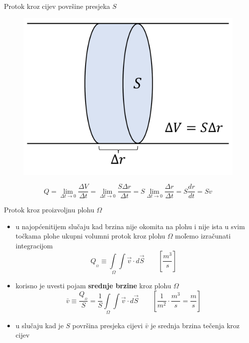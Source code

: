 \documentclass[croatian]{beamer}
\begin{document}
\begin{frame}{Protok kroz cijev površine presjeka $S$}

\begin{figure}
\includegraphics[scale=0.25]{figs/protok-kroz-cijev}
\end{figure}
\[
Q=\lim_{\Delta t\rightarrow0}\frac{\Delta V}{\Delta t}=\lim_{\Delta t\rightarrow0}\frac{S\Delta r}{\Delta t}=S\lim_{\Delta t\rightarrow0}\frac{\Delta r}{\Delta t}=S\frac{dr}{dt}=Sv
\]
\end{frame}

\begin{frame}{Protok kroz proizvoljnu plohu $\varOmega$}

\begin{itemize}
\item u najopćenitijem slučaju kad brzina nije okomita na plohu i nije ista
u svim točkama plohe ukupni volumni protok kroz plohu $\varOmega$
moľemo izračunati integracijom
\[
Q_{_{\varOmega}}\equiv\int\limits _{\;\varOmega}\!\!\!\!\!\int\vec{v}\cdot d\vec{S}\quad\quad[\frac{m^{3}}{s}]
\]
\item korisno je uvesti pojam \textbf{srednje brzine} kroz plohu $\varOmega$
\[
\bar{v}\equiv\frac{Q_{_{\varOmega}}}{S}=\frac{1}{S}\int\limits _{\;\varOmega}\!\!\!\!\!\int\vec{v}\cdot d\vec{S}\quad\quad[\frac{1}{m^{2}}\cdot\frac{m^{3}}{s}=\frac{m}{s}]
\]
\item u slučaju kad je $S$ površina presjeka cijevi $\bar{v}$ je srednja
brzina tečenja kroz cijev
\end{itemize}
\end{frame}
\end{document}
